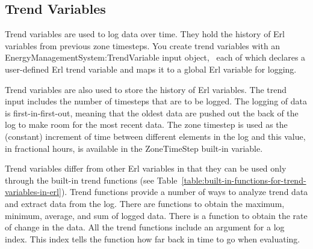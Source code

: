 \subsection{Trend Variables}\label{trend-variables}

Trend variables are used to log data over time. They hold the history of Erl variables from previous zone timesteps. You create trend variables with an EnergyManagementSystem:TrendVariable input object,~ each of which declares a user-defined Erl trend variable and maps it to a global Erl variable for logging.

Trend variables are also used to store the history of Erl variables. The trend input includes the number of timesteps that are to be logged. The logging of data is first-in-first-out, meaning that the oldest data are pushed out the back of the log to make room for the most recent data. The zone timestep is used as the (constant) increment of time between different elements in the log and this value, in fractional hours, is available in the ZoneTimeStep built-in variable.

Trend variables differ from other Erl variables in that they can be used only through the built-in trend functions (see Table~\ref{table:built-in-functions-for-trend-variables-in-erl}). Trend functions provide a number of ways to analyze trend data and extract data from the log. There are functions to obtain the maximum, minimum, average, and sum of logged data. There is a function to obtain the rate of change in the data. All the trend functions include an argument for a log index. This index tells the function how far back in time to go when evaluating.
